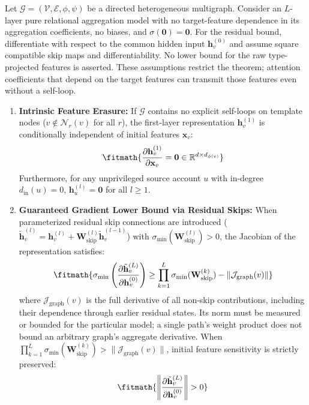 \begin{theorem}
\label{thm:theorem1}
Let $\mathcal{G} = (\mathcal{V}, \mathcal{E}, \phi, \psi)$ be a directed heterogeneous multigraph. Consider an $L$-layer pure relational aggregation model with no target-feature dependence in its aggregation coefficients, no biases, and $\sigma(\mathbf{0})=\mathbf{0}$. For the residual bound, differentiate with respect to the common hidden input $\mathbf h_v^{(0)}$ and assume square compatible skip maps and differentiability. No lower bound for the raw type-projected features is asserted. These assumptions restrict the theorem; attention coefficients that depend on the target features can transmit those features even without a self-loop.
\begin{enumerate}
    \item \textbf{Intrinsic Feature Erasure:} If $\mathcal{G}$ contains no explicit self-loops on template nodes ($v \notin \mathcal{N}_r(v)$ for all $r$), the first-layer representation $\mathbf{h}_v^{(1)}$ is conditionally independent of initial features $\mathbf{x}_v$:
    \begin{equation}
\fitmath{\frac{\partial \mathbf{h}_v^{(1)}}{\partial \mathbf{x}_v} = \mathbf{0} \in \mathbb{R}^{d \times d_{\phi(v)}}}
\end{equation}
    Furthermore, for any unprivileged source account $u$ with in-degree $d_{\text{in}}(u) = 0$, $\mathbf{h}_u^{(l)} = \mathbf{0}$ for all $l \ge 1$.
    \item \textbf{Guaranteed Gradient Lower Bound via Residual Skips:} When parameterized residual skip connections are introduced ($\tilde{\mathbf{h}}_v^{(l)} = \mathbf{h}_v^{(l)} + \mathbf{W}_{\text{skip}}^{(l)} \tilde{\mathbf{h}}_v^{(l-1)}$) with $\sigma_{\min}(\mathbf{W}_{\text{skip}}^{(l)}) > 0$, the Jacobian of the representation satisfies:
    \begin{equation}
\fitmath{\sigma_{\min} \left( \frac{\partial \tilde{\mathbf{h}}_v^{(L)}}{\partial \mathbf{h}_v^{(0)}} \right) \ge \prod_{k=1}^L \sigma_{\min}(\mathbf{W}_{\text{skip}}^{(k)}) - \|\mathcal{J}_{\text{graph}}(v)\|}
\end{equation}
    where $\mathcal{J}_{\text{graph}}(v)$ is the full derivative of all non-skip contributions, including their dependence through earlier residual states. Its norm must be measured or bounded for the particular model; a single path's weight product does not bound an arbitrary graph's aggregate derivative. When $\prod_{k=1}^L \sigma_{\min}(\mathbf{W}_{\text{skip}}^{(k)}) > \|\mathcal{J}_{\text{graph}}(v)\|$, initial feature sensitivity is strictly preserved:
    \begin{equation}
\fitmath{\left\| \frac{\partial \tilde{\mathbf{h}}_v^{(L)}}{\partial \mathbf{h}_v^{(0)}} \right\| > 0}
\end{equation}
\end{enumerate}
\end{theorem}


